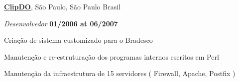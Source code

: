 \documentclass[10pt]{article}
\newenvironment{outerlist}[1][\enskip\textbullet]%
        {\begin{itemize}[#1]}{\end{itemize}%
         \vspace{-.6\baselineskip}}
\newenvironment{innerlist}[1][\enskip\textbullet]%
        {\begin{compactitem}[#1]}{\end{compactitem}}
\begin{document}
\href{http://www.clipdo.com.br/}{\textbf{ClipDO}}, 
São Paulo, São Paulo Brasil
\begin{outerlist}
\item[] \textit{Desenvolvedor}%
        \hfill \textbf{01/2006 at 06/2007}
\begin{innerlist}
\item Criação de sistema customizado para o Bradesco
\item Manutenção e re-estruturação dos programas internos escritos em Perl
\item Manutenção da infraestrutura de 15 servidores ( Firewall, Apache,
Postfix )
\end{innerlist}
\end{outerlist}
\end{document}
